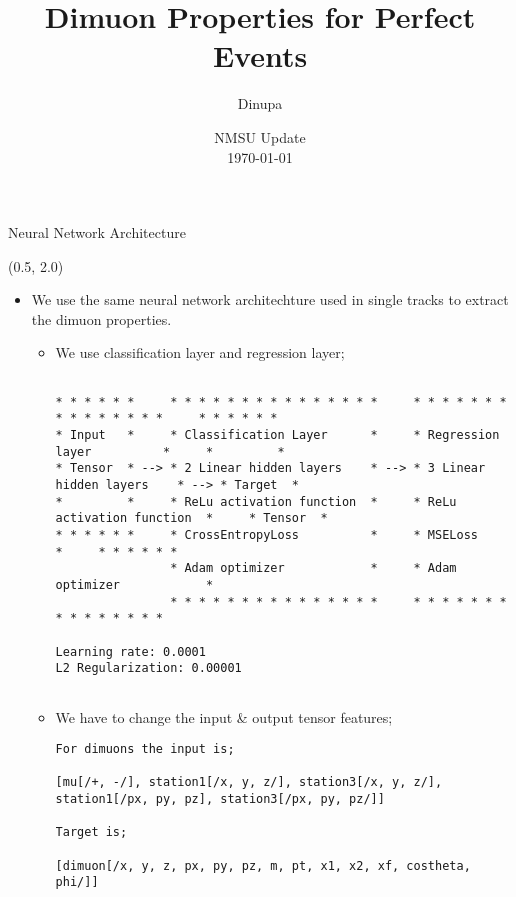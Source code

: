 \documentclass[10pt, xcolor={dvipsnames}, aspectratio = 169, sans,mathserif]{beamer}
\title{Dimuon Properties for Perfect Events}
\author{Dinupa}
\date{NMSU Update
\\ \today}
\begin{document}
\begin{frame}
    \maketitle
\end{frame}


\begin{frame}[fragile]{Neural Network Architecture}

\begin{textblock}{14.0}(0.5, 2.0)
\begin{itemize}

    \item We use the same neural network architechture used in single tracks to extract the dimuon properties.
    
    \begin{itemize}
    
    \item We use classification layer and regression layer;
    
        \begin{scriptsize}
        \begin{verbatim}
        
* * * * * *     * * * * * * * * * * * * * * *     * * * * * * * * * * * * * * *     * * * * * *
* Input   *     * Classification Layer      *     * Regression layer          *     *         *
* Tensor  * --> * 2 Linear hidden layers    * --> * 3 Linear hidden layers    * --> * Target  *
*         *     * ReLu activation function  *     * ReLu activation function  *     * Tensor  *
* * * * * *     * CrossEntropyLoss          *     * MSELoss                   *     * * * * * *
                * Adam optimizer            *     * Adam optimizer            *
                * * * * * * * * * * * * * * *     * * * * * * * * * * * * * * *

Learning rate: 0.0001
L2 Regularization: 0.00001
        
        \end{verbatim}
        \end{scriptsize}
        
        \item We have to change the input \& output tensor features;
        
        \begin{scriptsize}
        \begin{verbatim}
For dimuons the input is;
        
[mu[/+, -/], station1[/x, y, z/], station3[/x, y, z/], station1[/px, py, pz], station3[/px, py, pz/]]
        
Target is;
        
[dimuon[/x, y, z, px, py, pz, m, pt, x1, x2, xf, costheta, phi/]]
        \end{verbatim}
        \end{scriptsize}
    
    \end{itemize}

\end{itemize}
\end{textblock}

\end{frame}
\end{document}
